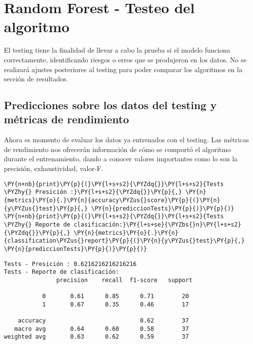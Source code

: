     \hypertarget{random-forest---testeo-del-algoritmo}{%
\section{Random Forest - Testeo del
algoritmo}\label{random-forest---testeo-del-algoritmo}}

El testing tiene la finalidad de llevar a cabo la prueba si el modelo
funciona correctamente, identificando riesgos o erros que se produjeron
en los datos. No se realizará ajustes posteriores al testing para poder
comparar los algoritmos en la sección de resultados.

    \hypertarget{predicciones-sobre-los-datos-del-testing-y-muxe9tricas-de-rendimiento}{%
\subsection{Predicciones sobre los datos del testing y métricas de
rendimiento}\label{predicciones-sobre-los-datos-del-testing-y-muxe9tricas-de-rendimiento}}

Ahora es momento de evaluar los datos ya entrenados con el testing. Las
métricas de rendimiento nos ofrecerán información de cómo se comportó el
algoritmo durante el entrenamiento, dando a conocer valores importantes
como lo son la precisión, exhaustividad, valor-F.

    \begin{tcolorbox}[breakable, size=fbox, boxrule=1pt, pad at break*=1mm,colback=cellbackground, colframe=cellborder]
\begin{Verbatim}[commandchars=\\\{\}]
\PY{n+nb}{print}\PY{p}{(}\PY{l+s+s2}{\PYZdq{}}\PY{l+s+s2}{Tests \PYZhy{} Presición :}\PY{l+s+s2}{\PYZdq{}}\PY{p}{,} \PY{n}{metrics}\PY{o}{.}\PY{n}{accuracy\PYZus{}score}\PY{p}{(}\PY{n}{y\PYZus{}test}\PY{p}{,} \PY{n}{prediccionTests}\PY{p}{)}\PY{p}{)}
\PY{n+nb}{print}\PY{p}{(}\PY{l+s+s2}{\PYZdq{}}\PY{l+s+s2}{Tests \PYZhy{} Reporte de clasificación:}\PY{l+s+se}{\PYZbs{}n}\PY{l+s+s2}{\PYZdq{}}\PY{p}{,} \PY{n}{metrics}\PY{o}{.}\PY{n}{classification\PYZus{}report}\PY{p}{(}\PY{n}{y\PYZus{}test}\PY{p}{,} \PY{n}{prediccionTests}\PY{p}{)}\PY{p}{)}
\end{Verbatim}
\end{tcolorbox}

    \begin{Verbatim}[commandchars=\\\{\}]
Tests - Presición : 0.6216216216216216
Tests - Reporte de clasificación:
               precision    recall  f1-score   support

           0       0.61      0.85      0.71        20
           1       0.67      0.35      0.46        17

    accuracy                           0.62        37
   macro avg       0.64      0.60      0.58        37
weighted avg       0.63      0.62      0.59        37

    \end{Verbatim}

